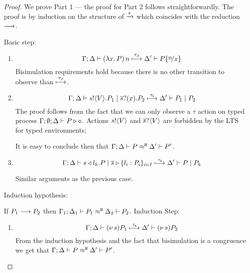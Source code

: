 \begin{proof}
	\noi 
	We prove Part 1 --- the proof for Part 2 follows straightforwardly.
	The proof is by induction on the structure of $\xrightarrow{\tau}$
	which coincides with the reduction $\longrightarrow$.

	\noi Basic step:
	\begin{enumerate}
		\item %
		\[
			\horel{\Gamma}{\Delta}{\appl{(\abs{x}{P})}{n}}{\hby{\btau}}{\Delta'}{P \subst{n}{x}}
		\]
		\noi Bisimulation requirements hold because there is no other transition to observe than ${\stackrel{\tau_{\beta}}{\longmapsto}}$.

		\item %
		\[
			\Gamma; \Delta \vdash s ! \langle V \rangle . P_1 \;|\; \overline{s} ? (x) . P_2 \stackrel{\tau_{\mathsf{s}}}{\longmapsto} \Delta' \vdash P_1 \;|\; P_2
		\]
		\noi The proof follows from the fact that we can only observe a $\tau$
		action on typed process
		$\Gamma; \emptyset; \Delta \vdash P \triangleright \diamond$.
		Actions $s ! \langle V \rangle$ and $\overline{s} ? \langle V \rangle$
		are forbidden by the LTS for typed environments;

		\noi It is easy to conclude then that $\Gamma; \Delta \vdash P \approx^\mathtt{H} \Delta' \vdash P'$.

		\item %
			\[
				\Gamma; \Delta \vdash s \triangleleft l_k . P \;|\; \overline{s} \triangleright \{l_i: P_i\}_{i \in I} \stackrel{\tau_{\mathsf{s}}}{\longmapsto} \Delta' \vdash P \;|\; P_k
			\]

		\noi Similar arguments as the previous case.
	\end{enumerate}
	
	\noi Induction hypothesis:

	\noi If $P_1 \longrightarrow P_2$ then $\Gamma_1; \Delta_1 \vdash P_1 \approx^\mathtt{H} \Delta_2 \vdash P_2$.
	\noi Induction Step:
	\begin{enumerate}
		\item %
		\[
			\Gamma; \Delta \vdash (\nu\, s){P_1} \stackrel{\tau_{\mathsf{s}}}{\longmapsto} \Delta' \vdash (\nu\, s) P_2
		\]
		\noi From the induction hypothesis and the fact that bisimulation is a congruence
		we get that $\Gamma; \Delta \vdash P \approx^\mathtt{H} \Delta' \vdash P'$.


\end{enumerate}
\end{proof}
